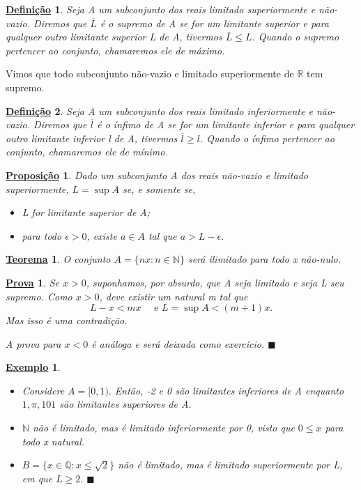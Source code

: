 \documentclass{article}
\newtheorem*{def*}{\underline{Defini\c c\~ao}}
\newtheorem*{theorem*}{\underline{Teorema}}
\newtheorem*{prop*}{\underline{Proposi\c c\~ao}}
\newtheorem{example}{\underline{Exemplo}}
\newtheorem*{proof*}{\underline{Prova}}
\renewcommand\qedsymbol{$\blacksquare$}
\begin{document}
\begin{def*}
  Seja A um subconjunto dos reais limitado superiormente e n\~ao-vazio. Diremos que $\overline{L}$ \'e o supremo de A se for um limitante superior
  e para qualquer outro limitante superior L de A, tivermos $\overline{L}\leq L$. Quando o supremo pertencer ao conjunto, chamaremos ele de m\'aximo.
\end{def*}
  Vimos que todo subconjunto n\~ao-vazio e limitado superiormente de $\mathbb{R}$ tem supremo.
\begin{def*}
  Seja A um subconjunto dos reais limitado inferiormente e n\~ao-vazio. Diremos que $\overline{l}$ \'e o \'infimo de A se for um limitante inferior
  e para qualquer outro limitante inferior l de A, tivermos $\overline{l}\geq l$. Quando o \'infimo pertencer ao conjunto, chamaremos ele de m\'inimo.
\end{def*}
\begin{prop*}
  Dado um subconjunto A dos reais n\~ao-vazio e limitado superiormente, $L = \sup{A}$ se, e somente se, 
 \begin{itemize}
   \item[a)] L for limitante superior de A;
   \item[b)] para todo $\epsilon > 0$, existe $a\in A$ tal que $a > L - \epsilon.$ 
 \end{itemize}
\end{prop*}
\begin{theorem*}
  O conjunto $A=\{nx: n\in\mathbb{N}\}$ ser\'a ilimitado para todo x n\~ao-nulo.
\end{theorem*}
\begin{proof*}
  Se $x > 0$, suponhamos, por absurdo, que A seja limitado e seja L seu supremo. Como $x > 0$, deve existir um natural m tal que
  $$
    L - x < mx \quad\text{ e } L = \sup{A} < (m+1)x.
  $$
  Mas isso \'e uma contradi\c c\~ao. 

  A prova para $x < 0$ \'e an\'aloga e ser\'a deixada como exerc\'icio. \qedsymbol 
\end{proof*}
 \begin{example}
  \begin{itemize}
    \item[a)] Considere $A = [0, 1).$ Ent\~ao, -2 e 0 s\~ao limitantes inferiores de A enquanto $1, \pi, 101$ s\~ao limitantes
  superiores de A.
    \item[b)] $\mathbb{N}$ n\~ao \'e limitado, mas \'e limitado inferiormente por 0, visto que $0\leq{x}$ para todo x natural.
    \item[c)] $B=\{x\in \mathbb{Q}: x\leq{\sqrt{2}}\}$ n\~ao \'e limitado, mas \'e limitado superiormente por L, em que $L\geq{2}.$ \qedsymbol
  \end{itemize}
 \end{example}
\end{document}
